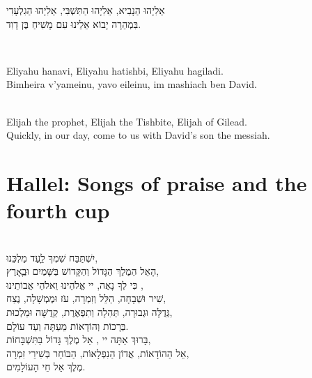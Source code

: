 \documentclass[extrafontsizes,twoside,17pt,a4paper,openany]{memoir}
\newcommand{\HgInst}[1]{{\noindent\sffamily{{#1}}}}
\newenvironment{HgHebrew}{\begin{hebrew}\noindent\large}{\end{hebrew}}
\newenvironment{HgHebrewl}{\begin{hebrew}\strut\\\noindent}{\end{hebrew}}
\newenvironment{HgEnglish}{\strut\\\noindent}{\vspace{1em}}
\newenvironment{HgTranslit}{\strut\\\noindent\begin{itshape}}{\end{itshape}\vspace{1em}}
\begin{document}
\vfill

\begin{HgHebrew}
  אֵלִיָהוּ הַנָבִיא, אֵלִיָהוּ הַתִּשְׁבִּי, אֵלִיָהוּ הַגִלְעָדִי 
  \\
  בִּמְהֵרָה יָבוֹא אֵלֵינוּ עִם מָשִׁיחַ בֶּן דָוִד.
\end{HgHebrew}

\begin{HgTranslit}
  Eliyahu hanavi, Eliyahu hatishbi, Eliyahu hagiladi. \\
  Bimheira v'yameinu, yavo eileinu, im mashiach ben David.
\end{HgTranslit}
\vspace{-1em}

\begin{HgEnglish}
  Elijah the prophet, Elijah the Tishbite, Elijah of Gilead. \\
  Quickly, in our day, come to us with David's son the messiah.
\end{HgEnglish}

\vfill

\newpage

\chapter{Hallel: Songs of praise and the fourth cup}

\HgInst{Recite:}

\begin{HgHebrewl}
  יִשְׁתַּבַּח שִׁמְךָ לַָעַד מַלְכֵּנוּ,  \\
  הָאֵל הַמֶלֶךְ הַגָּדוֹל וְהַקָּדוֹשׁ בַּשָּׁמַיִם וּבַָאָרֶץ, \\
  כִּי לְךָ נָאֶה, יי אֱלֹהֵינוּ וֵאלֹהֵי אֲבוֹתֵינוּ ,  \\
  שִׁיר וּשְׁבָחָה, הַלֵּל וְזִמְרָה, עֹז וּמֶמְשָׁלָה, נֶצַח,  \\
  גְּדֻלָּה וּגְבוּרָה, תְּהִלָה וְתִפְאֶרֶת, קְדֻשָּׁה וּמַלְכוּת, \\
  בְּרָכוֹת וְהוֹדָאוֹת מֵעַתָּה וְעַד עוֹלָם.  \\
  בָּרוּךְ אַתָּה יי , אֵל מֶלֶךְ גָּדוֹל בַּתִּשְׁבָּחוֹת,  \\
  אֵל הַהוֹדָאוֹת, אֲדוֹן הַנִפְלָאוֹת, הַבּוֹחֵר בְּשִׁירֵי זִמְרָה,  \\
  מֶלֶךְ אֵל חֵי הָעוֹלָמִים. 
\end{HgHebrewl}
\end{document}
